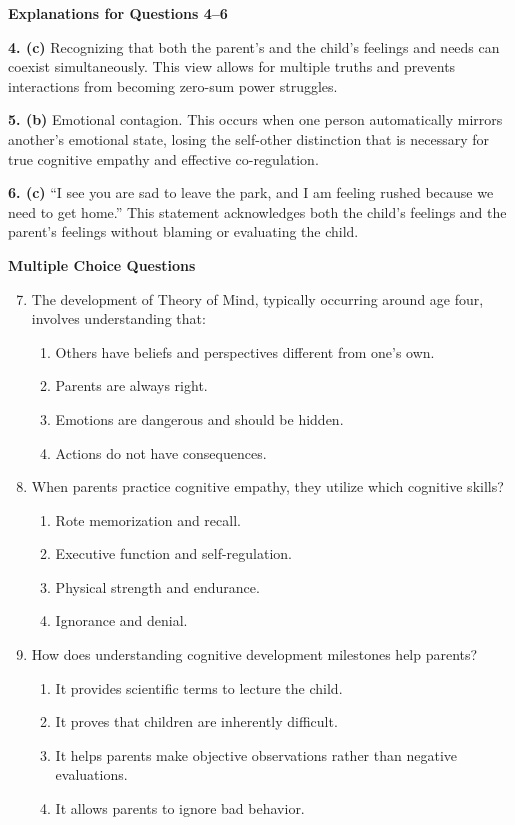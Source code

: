 \begin{practiceexercise}
\textbf{Explanations for Questions 4--6}

\textbf{4. (c)} Recognizing that both the parent's and the child's feelings and needs can coexist simultaneously. This view allows for multiple truths and prevents interactions from becoming zero-sum power struggles.

\textbf{5. (b)} Emotional contagion. This occurs when one person automatically mirrors another's emotional state, losing the self-other distinction that is necessary for true cognitive empathy and effective co-regulation.

\textbf{6. (c)} ``I see you are sad to leave the park, and I am feeling rushed because we need to get home.'' This statement acknowledges both the child's feelings and the parent's feelings without blaming or evaluating the child.
\vspace{\fill}
\newpage

\textbf{Multiple Choice Questions}
\begin{enumerate}
  \setcounter{enumi}{6}
  \item The development of Theory of Mind, typically occurring around age four, involves understanding that:
  \begin{enumerate}
    \item Others have beliefs and perspectives different from one's own.
    \item Parents are always right.
    \item Emotions are dangerous and should be hidden.
    \item Actions do not have consequences.
  \end{enumerate}
  \vspace{\fill}
  \item When parents practice cognitive empathy, they utilize which cognitive skills?
  \begin{enumerate}
    \item Rote memorization and recall.
    \item Executive function and self-regulation.
    \item Physical strength and endurance.
    \item Ignorance and denial.
  \end{enumerate}
  \vspace{\fill}
  \item How does understanding cognitive development milestones help parents?
  \begin{enumerate}
    \item It provides scientific terms to lecture the child.
    \item It proves that children are inherently difficult.
    \item It helps parents make objective observations rather than negative evaluations.
    \item It allows parents to ignore bad behavior.
  \end{enumerate}
\end{enumerate}
\vspace{\fill}
\newpage


\end{practiceexercise}
